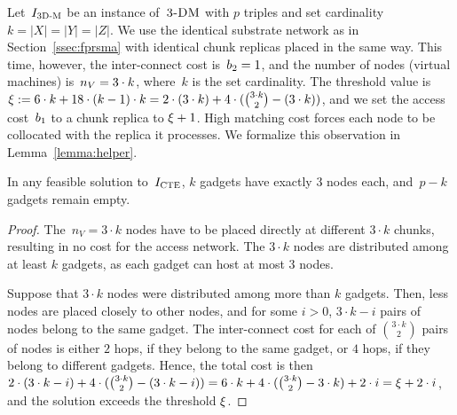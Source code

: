 Let~$I_{\mathrm{\textsc{3D-M}}}$ be an instance of~$\textsc{3-DM}$ with $p$ triples and set cardinality $k = |X| = |Y| = |Z|$.
We use the identical substrate network as in Section~\ref{ssec:fprsma} with
identical chunk replicas placed in the same way.
This time, however, the inter-connect cost is~$b_2 = 1$, and the number of nodes (virtual machines) is~$n_V = 3 \cdot k$, where~$k$ is the set cardinality.
The threshold value is $\xi := 6\cdot k + 18\cdot (k-1)\cdot k = 2\cdot (3\cdot k) + 4\cdot({ 3\cdot k \choose 2} - (3\cdot k))$, and we set the access cost~$b_1$ to a chunk replica to $\xi + 1$.
High matching cost forces each node to be collocated with the replica it processes.
We formalize this observation in Lemma~\ref{lemma:helper}.
\begin{lemma}\label{lemma:helper}
In any feasible solution to~$I_{\mathrm{\textsc{CTE}}}$, $k$ gadgets have exactly
$3$ nodes each, and~$p-k$ gadgets remain empty.
\end{lemma}
\begin{proof}
The~$n_V = 3\cdot k$ nodes have to be placed
directly at different $3\cdot k$ chunks, resulting in no cost for the access network.
The $3\cdot k$ nodes are distributed among at least $k$ gadgets, as each gadget can host at most $3$ nodes.

Suppose that $3\cdot k$ nodes were distributed among more than $k$ gadgets.
Then, less nodes are placed closely to other nodes, and for some $i>0$, $3\cdot k - i$ pairs of nodes belong to the same gadget.
The inter-connect cost
for each of ${3\cdot k \choose 2}$ pairs of nodes is either
$2$ hops, if they belong to the same gadget, or $4$ hops, if they belong
to different gadgets.
Hence, the total cost is then $2\cdot (3\cdot k - i) + 4 \cdot ({3 \cdot k \choose 2} - (3\cdot k - i)) = 6\cdot k + 4 \cdot ({3 \cdot k \choose 2} - 3\cdot k) + 2\cdot i = \xi + 2\cdot i$, and the solution exceeds the threshold $\xi$.
\end{proof}

